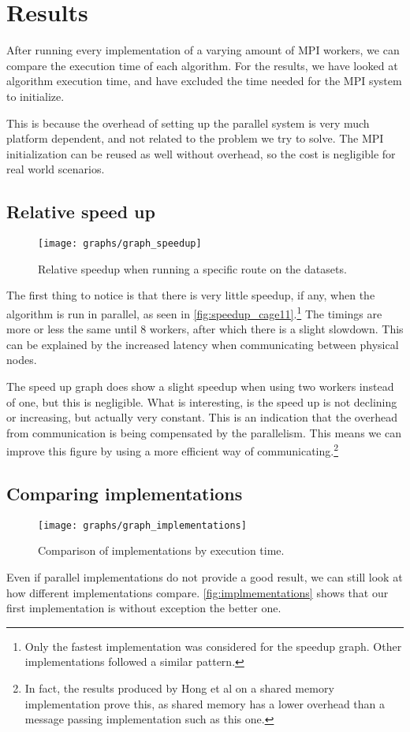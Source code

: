 \section{Results}

After running every implementation of a varying amount of MPI workers, we can compare the execution time of each algorithm. For the results, we have looked at algorithm execution time, and have excluded the time needed for the MPI system to initialize.

This is because the overhead of setting up the parallel system is very much platform dependent, and not related to the problem we try to solve. The MPI initialization can be reused as well without overhead, so the cost is negligible for real world scenarios.

\subsection{Relative speed up}

\begin{figure}
  \texttt{[image: graphs/graph\_speedup]}
  \caption{Relative speedup when running a specific route on the datasets.}
  \label{fig:speedup_cage11}
\end{figure}

The first thing to notice is that there is very little speedup, if any, when the algorithm is run in parallel, as seen in \autoref{fig:speedup_cage11}.\footnote{Only the fastest implementation was considered for the speedup graph. Other implementations followed a similar pattern.} The timings are more or less the same until 8 workers, after which there is a slight slowdown. This can be explained by the increased latency when communicating between physical nodes.

The speed up graph does show a slight speedup when using two workers instead of one, but this is negligible. What is interesting, is the speed up is not declining or increasing, but actually very constant. This is an indication that the overhead from communication is being compensated by the parallelism. This means we can improve this figure by using a more efficient way of communicating.\footnote{In fact, the results produced by Hong et al \cite{LockFreeMultithreadedMaxFlow} on a shared memory implementation prove this, as shared memory has a lower overhead than a message passing implementation such as this one.}

\subsection{Comparing implementations}

\begin{figure}
  \texttt{[image: graphs/graph\_implementations]}
  \caption{Comparison of implementations by execution time.}
  \label{fig:implmementations}
\end{figure}

Even if parallel implementations do not provide a good result, we can still look at how different implementations compare. \autoref{fig:implmementations} shows that our first implementation is without exception the better one.
